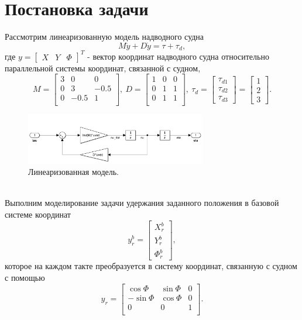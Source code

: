 \documentclass[12pt]{article}
\begin{document}
\section*{Постановка задачи}
Рассмотрим линеаризованную модель надводного судна
\[
M \ddot{y} + D \dot{y} = \tau +\tau_d,
\]
где $y = \begin{bmatrix} X & Y & \Phi \end{bmatrix} ^T$ - вектор координат надводного судна относительно параллельной системы координат, связанной с судном,
\[
M = \begin{bmatrix}
    3 & 0 & 0 \\
    0 & 3 & -0.5 \\
    0 & -0.5 & 1 \\
\end{bmatrix}, \
D = \begin{bmatrix}
    1 & 0 & 0 \\
    0 & 1 & 1 \\
    0 & 1 & 1 \\
\end{bmatrix}, \
\tau_d = \begin{bmatrix} \tau_{d1} \\ \tau_{d2} \\ \tau_{d3} \end{bmatrix} =
\begin{bmatrix} 1 \\ 2 \\ 3 \end{bmatrix}.
\]
\begin{figure}[H]
    \centering
    \includegraphics[width=0.7\textwidth]{model.png}
    \caption{Линеаризованная модель.}
    \label{fig:model.png}
\end{figure}\\
Выполним моделирование задачи удержания заданного положения в базовой системе координат
\[
y^b_r = \begin{bmatrix} X^b_r \\ Y^b_r \\ \Phi^b_r \end{bmatrix},
\] которое на каждом такте преобразуется в систему координат, связанную с судном с помощью
\[
y_r = \begin{bmatrix}
    \cos{\Phi} & \sin{\Phi} & 0 \\
    -\sin{\Phi} & \cos{\Phi} & 0 \\
    0 & 0 & 1 \\
\end{bmatrix}.
\]
\end{document}
